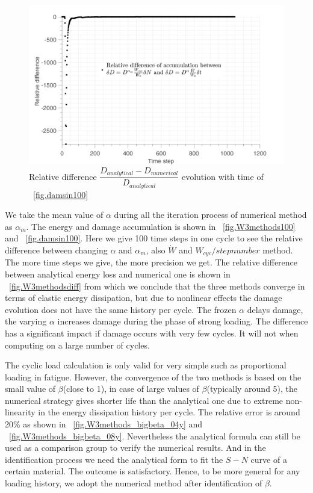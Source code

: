 \documentclass[3p,times,procedia,number]{elsarticle}
\newcommand{\figref}[1]{\figurename~\ref{#1}}
\begin{document}
\begin{figure}[!h]
	\centering
	\includegraphics[width=\textwidth]{figures//D_3methods_diff_100steps.png} 
	\caption{Relative difference $\dfrac{D_{analytical}-D_{numerical}}{D_{analytical}}$ evolution with time of \figref{fig.damsin100}}
	\label{Damagediff}
\end{figure}
We take the mean value of $\alpha$ during all the iteration process of numerical method as $\alpha_{m}$. The energy and damage accumulation is shown in \figref{fig.W3methods100} and \figref{fig.damsin100}. Here we give 100 time steps in one cycle to see the relative difference between changing $\alpha$ and $\alpha_{m}$, also $\dot{W}$ and $W_{cyc}/stepnumber$  method. The more time steps we give, the more precision we get. The relative difference between analytical energy loss and numerical one is shown in \figref{fig.W3methodsdiff} from which we conclude that the three methods converge in terms of elastic energy dissipation, but due to nonlinear effects the damage evolution does not have the same history per cycle. The frozen $\alpha$ delays damage, the varying $\alpha$ increases damage during the phase of strong loading. The difference has a significant impact if damage occurs with very few cycles. It will not when computing on a large number of cycles.

The cyclic load calculation is only valid for very simple such as proportional loading in fatigue. However, the convergence of the two methods is based on the small value of $\beta$(close to 1), in case of large values of $\beta$(typically around 5), the numerical strategy gives shorter life than the analytical one due to extreme non-linearity in the energy dissipation history per cycle. The relative error is around 20\% as shown in \figref{fig.W3methods_bigbeta_04y} and \figref{fig.W3methods_bigbeta_08y}. Nevertheless the analytical formula can still be used as a comparison group to verify the numerical results. And in the identification process we need the analytical form to fit the $S-N$ curve of a certain material. The outcome is satisfactory. Hence, to be more general for any loading history, we adopt the numerical method after identification of $\beta$. 
\end{document}
